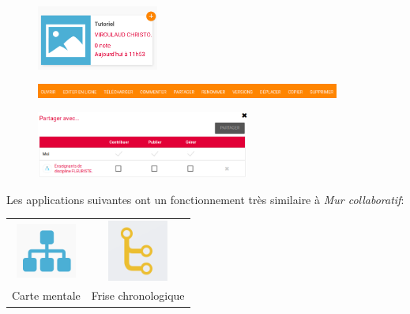 \documentclass[a4paper,11pt]{article}
\begin{document}
\begin{Form}
\begin{activite}
\end{activite}
\begin{figure}[!h]
\centering
\includegraphics[width=4cm]{ressources/mur_parametre.png}
\label{param-mur}
\end{figure}
\medskip
\begin{figure}[!h]
\centering
\includegraphics[width=10cm]{ressources/menubas.png}
\label{menubas}
\end{figure}
\begin{figure}[!h]
\centering
\includegraphics[width=7cm]{ressources/partage.png}
\label{partage}
\end{figure}
Les applications suivantes ont un fonctionnement très similaire à \emph{Mur collaboratif}:
\begin{center}
\begin{tabular}{cc}
\includegraphics[width=2cm]{ressources/carte.png}
 & \includegraphics[width=2cm]{ressources/frise.png}
 \\ 
Carte mentale & Frise chronologique \\ 
\end{tabular} 
\end{center}


\end{Form}
\end{document}
